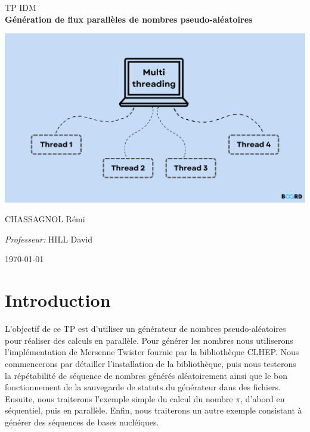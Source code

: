\documentclass[a4paper]{article}
\begin{document}
\begin{titlepage}
\begin{center}

    \textsc{\LARGE TP IDM}\\[0.5cm]

    {\huge \bfseries Génération de flux parallèles de nombres pseudo-aléatoires\\[3cm]}

      \centering
      \includegraphics[scale=0.3]{./img/banner.png}

      \vspace*{\fill}

    \begin{multicols}{2}
      \large
      CHASSAGNOL Rémi\\

      \columnbreak

      \large
      \emph{Professeur:} HILL David\\
    \end{multicols}

    \textsc{\today}

  \end{center}
\end{titlepage}

\clearpage
\tableofcontents
\clearpage

\section{Introduction}

L'objectif de ce TP est d'utiliser un générateur de nombres pseudo-aléatoires
pour réaliser des calculs en parallèle. Pour générer les nombres nous
utiliserons l'implémentation de Mersenne Twister fournie par la bibliothèque
CLHEP. Nous commencerons par détailler l'installation de la bibliothèque, puis
nous testerons la répétabilité de séquence de nombres générés aléatoirement
ainsi que le bon fonctionnement de la sauvegarde de statuts du générateur dans
des fichiers. Ensuite, nous traiterons l'exemple simple du calcul du nombre
$\pi$, d'abord en séquentiel, puis en parallèle. Enfin, nous traiterons un autre
exemple consistant à générer des séquences de bases nucléiques.\\
\end{document}
